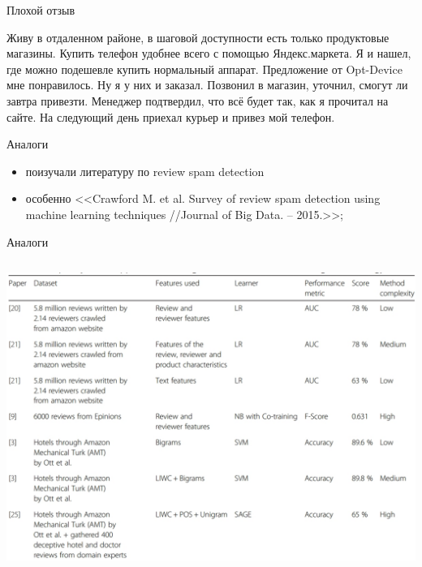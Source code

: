 \documentclass[mathserif,utf8,14pt]{beamer}
\begin{document}
\begin{frame}{Плохой отзыв}

     \addtocounter{framenumber}{-1}
                Живу в отдаленном районе, в шаговой доступности есть 
                только продуктовые магазины. 
                Купить телефон удобнее всего с помощью Яндекс.маркета. 
                Я и нашел, 
                где можно подешевле купить нормальный аппарат. 
                Предложение от Opt-Device мне понравилось. 
                Ну я у них и заказал. Позвонил в магазин, уточнил, смогут ли завтра привезти. 
                Менеджер подтвердил, что всё будет так, как я прочитал на сайте. 
                На следующий день приехал курьер и привез мой телефон.
\end{frame}

\begin{frame}{Аналоги}
    \begin{itemize}
        \item поизучали литературу по review spam detection
        \item особенно
            <<Crawford M. et al. Survey of review spam detection using machine learning techniques //Journal of Big Data. – 2015.>>;
    \end{itemize}
\end{frame}

\begin{frame}{Аналоги}
     \addtocounter{framenumber}{-1}
     \begin{columns}
         \column{\dimexpr\paperwidth-10pt}
     \includegraphics[scale=0.3]{./converted_jpg.pdf}
     \end{columns}
\end{frame}
\end{document}

